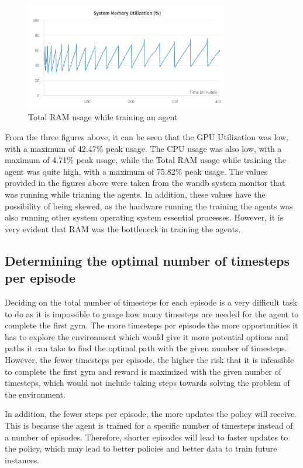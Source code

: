 \begin{figure}[H]
    \centering
    \includegraphics[width=0.8\textwidth]{figures/System_RAM_Utilization.png}
    \caption{Total RAM usage while training an agent}
    \label{fig:sys_memory_useage}
\end{figure}

From the three figures above, it can be seen that the GPU Utilization was low, with a maximum of 42.47\% peak usage. The CPU usage was also low, with a maximum of 4.71\% peak usage, while the Total RAM usage while training the agent was quite high, with a maximum of 75.82\% peak usage. The values provided in the figures above were taken from the wandb system monitor that was running while trianing the agents. In addition, these values have the possibility of being skewed, as the hardware running the training the agents was also running other system operating system essential processes. However, it is very evident that RAM was the bottleneck in training the agents.  

\subsection{Determining the optimal number of timesteps per episode}

Deciding on the total number of timesteps for each episode is a very difficult task to do as it is impossible to guage how many timesteps are needed for the agent to complete the first gym. The more timesteps per episode the more opportunities it has to explore the environment which would give it more potential options and paths it can take to find the optimal path with the given number of timesteps. However, the fewer timesteps per episode, the higher the risk that it is infeasible to complete the first gym and reward is maximized with the given number of timesteps, which would not include taking steps towards solving the problem of the environment. 

In addition, the fewer steps per episode, the more updates the policy will receive. This is because the agent is trained for a specific number of timesteps instead of a number of episodes. Therefore, shorter episodes will lead to faster updates to the policy, which may lead to better policies and better data to train future instances. 

